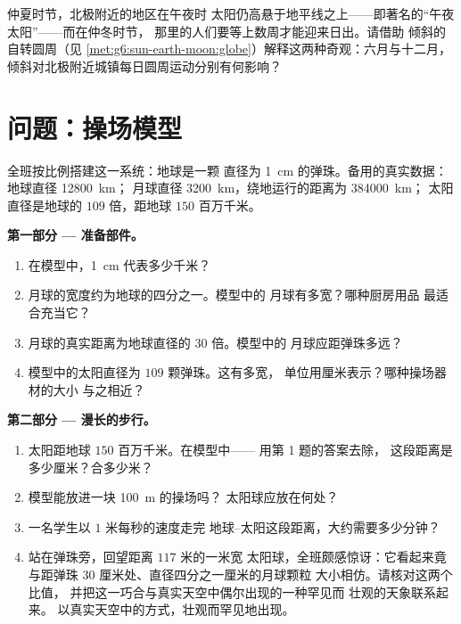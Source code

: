 \begin{exercise}[$\star\star\star$]\label{exo:g6:sun-earth-moon:12}
仲夏时节，北极附近的地区在午夜时
太阳仍高悬于地平线之上——即著名的“午夜太阳”——而在仲冬时节，
那里的人们要等上数周才能迎来日出。请借助
倾斜的自转圆周（见
\cref{met:g6:sun-earth-moon:globe}）解释这两种奇观：六月与十二月，
倾斜对北极附近城镇每日圆周运动分别有何影响？
\end{exercise}

\section{问题：操场模型}

\begin{problem}\label{pb:g6:sun-earth-moon:1}
全班按比例搭建这一系统：地球是一颗
直径为 \qty{1}{cm} 的弹珠。备用的真实数据：地球直径 \qty{12800}{km}；
月球直径 \qty{3200}{km}，绕地运行的距离为 \qty{384000}{km}；
太阳直径是地球的 $109$ 倍，距地球 $150$ 百万千米。

\medskip\noindent\textbf{第一部分 --- 准备部件。}
\begin{enumerate}
  \item 在模型中，\qty{1}{cm} 代表多少千米？
  \item 月球的宽度约为地球的四分之一。模型中的
        月球有多宽？哪种厨房用品
        最适合充当它？
  \item 月球的真实距离为地球直径的 $30$ 倍。模型中的
        月球应距弹珠多远？
  \item 模型中的太阳直径为 $109$ 颗弹珠。这有多宽，
        单位用厘米表示？哪种操场器材的大小
        与之相近？
\end{enumerate}

\medskip\noindent\textbf{第二部分 --- 漫长的步行。}
\begin{enumerate}[resume]
  \item 太阳距地球 $150$ 百万千米。在模型中——
        用第 1 题的答案去除，
        这段距离是多少厘米？合多少米？
  \item 模型能放进一块 \qty{100}{m} 的操场吗？
        太阳球应放在何处？
  \item 一名学生以 $1$ 米每秒的速度走完
        地球--太阳这段距离，大约需要多少分钟？
  \item 站在弹珠旁，回望距离 $117$ 米的一米宽
        太阳球，全班颇感惊讶：它看起来竟与距弹珠
        $30$ 厘米处、直径四分之一厘米的月球颗粒
        大小相仿。请核对这两个比值，
        并把这一巧合与真实天空中偶尔出现的一种罕见而
        壮观的天象联系起来。
        以真实天空中的方式，壮观而罕见地出现。
\end{enumerate}


\end{problem}
